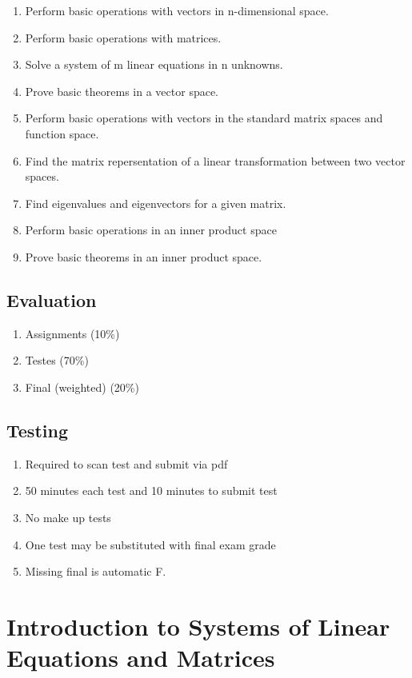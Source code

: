 \begin{enumerate}
	\item Perform basic operations with vectors in n-dimensional space.
		\item Perform basic operations with matrices.
			\item Solve a system of m linear equations in n unknowns.
\item Prove basic theorems in a vector space.
	\item Perform basic operations with vectors in the standard matrix spaces and function space.
		\item Find the matrix repersentation of a linear transformation between two vector spaces.
		\item Find eigenvalues and eigenvectors for a given matrix.
			\item Perform basic operations in an inner product space
				\item Prove basic theorems in an inner product space.
\end{enumerate}
\subsection{Evaluation}%
\label{ssec:evaluation}

\begin{enumerate}
	\item Assignments (10\%)
	\item Testes (70\%)
	\item Final (weighted) (20\%)
\end{enumerate}

\subsection{Testing}%
\label{sub:testing}

\begin{enumerate}
	\item Required to scan test and submit via pdf
	\item 50 minutes each test and 10 minutes to submit test
	\item No make up tests
	\item One test may be substituted with final exam grade
	\item Missing final is automatic F.
\end{enumerate}

\section{Introduction to Systems of Linear Equations and Matrices}%
\label{sec:systems_of_linear_equations_and_matric}

